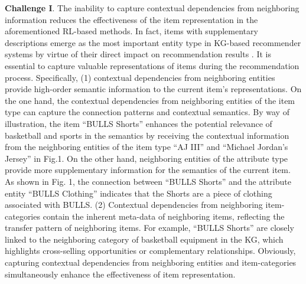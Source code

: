 \documentclass[conference]{IEEEtran}
\begin{document}

\textbf{Challenge I}. The inability to capture contextual dependencies from neighboring information reduces the effectiveness of the item representation in the aforementioned RL-based methods.
In fact, items with supplementary descriptions emerge as the most important entity type in KG-based recommender systems by virtue of their direct impact on recommendation results \cite{survey2}. It is essential to capture valuable representations of items during the recommendation process. Specifically, (1) contextual dependencies from neighboring entities provide high-order semantic information to the current item's representations. On the one hand, the contextual dependencies from neighboring entities of the item type can capture the connection patterns and contextual semantics. By way of illustration, the item ``BULLS Shorts'' enhances the potential relevance of basketball and sports in the semantics by receiving the contextual information from the neighboring entities of the item type ``AJ III''  and ``Michael Jordan's Jersey'' in Fig.1. On the other hand, neighboring entities of the attribute type provide more supplementary information for the semantics of the current item. As shown in Fig. 1,  the connection between ``BULLS Shorts'' and the attribute entity ``BULLS Clothing'' indicates that the Shorts are a piece of clothing associated with BULLS. (2) Contextual dependencies from neighboring item-categories contain the inherent meta-data of neighboring items, reflecting the transfer pattern of neighboring items. For example, ``BULLS Shorts'' are closely linked to the neighboring category of basketball equipment in the KG, which highlights cross-selling opportunities or complementary relationships. Obviously, capturing contextual dependencies from neighboring entities and item-categories simultaneously enhance the effectiveness of item representation.


\end{document}
